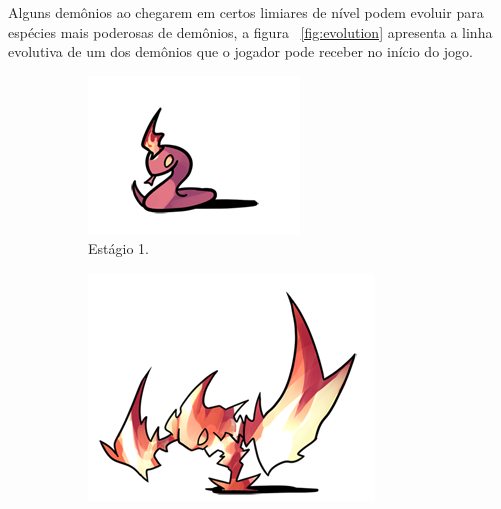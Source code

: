 \documentclass[
	12pt,				%
	openright,			%
	twoside,			%
	a4paper,			%
	english,			%
	french,				%
	spanish,			%
	brazil				%
	]{abntex2}
\begin{document}
	Alguns demônios ao chegarem em certos limiares de nível podem evoluir para espécies mais poderosas de demônios, a figura ~\ref{fig:evolution} apresenta a linha evolutiva de um dos demônios que o jogador pode receber no início do jogo.
	
\begin{figure}[h!]
  \centering
  \begin{subfigure}[b]{0.2\linewidth}
    \includegraphics[width=\linewidth]{stage1.png}
     \caption{Estágio 1.}
  \end{subfigure}
  \begin{subfigure}[b]{0.3\linewidth}
    \includegraphics[width=\linewidth]{stage2.png}

\end{subfigure}
\end{figure}
\end{document}
